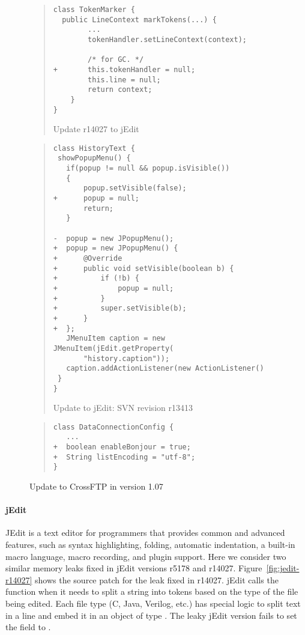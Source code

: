 \begin{figure}[t]
\vspace*{-1em}
\begin{quote}
\begin{lstlisting}
class TokenMarker {
  public LineContext markTokens(...) {
        ...
        tokenHandler.setLineContext(context);

        /* for GC. */
+       this.tokenHandler = null;
        this.line = null;
        return context;
    }
}
\end{lstlisting}
\vspace*{-.5em}
\caption{Update r14027 to jEdit\label{fig:jedit-r14027}}
\end{quote}
\vspace*{-1em}
\begin{quote}
\begin{lstlisting}
class HistoryText {
 showPopupMenu() {
   if(popup != null && popup.isVisible())
   {
       popup.setVisible(false);
+      popup = null;
       return;
   }
 
-  popup = new JPopupMenu();
+  popup = new JPopupMenu() {
+      @Override
+      public void setVisible(boolean b) {
+          if (!b) {
+              popup = null;
+          }
+          super.setVisible(b);
+      }
+  };
   JMenuItem caption = new JMenuItem(jEdit.getProperty(
       "history.caption"));
   caption.addActionListener(new ActionListener()
 }
}
\end{lstlisting}
\vspace*{-.5em}
\caption{Update to jEdit: SVN revision r13413\label{fig:jedit-r13413}}
\end{quote}
\vspace*{-1em}
\begin{quote}
\begin{lstlisting}
class DataConnectionConfig {
   ...
+  boolean enableBonjour = true;
+  String listEncoding = "utf-8";
}
\end{lstlisting}
\vspace*{-.5em}
\caption{Update to CrossFTP in version 1.07\label{fig:crossftp}}
\vspace*{-1.5em}
\end{quote}
\end{figure}

\paragraph*{jEdit}
JEdit is a text editor for programmers that provides common and
advanced features,
such as syntax highlighting, folding, automatic indentation, a  built-in macro language, macro recording,
and plugin support. Here we consider two similar memory leaks fixed in
jEdit versions r5178 and r14027.  Figure~\ref{fig:jedit-r14027} shows
the source patch for the leak fixed in r14027.  jEdit calls the function
 when it needs to split a string into tokens based on
the type of the file being edited. Each file type (C, Java, Verilog,
etc.) has special logic to split text in a line and embed it in an object
of type . The leaky jEdit version fails to set the
field  to .

